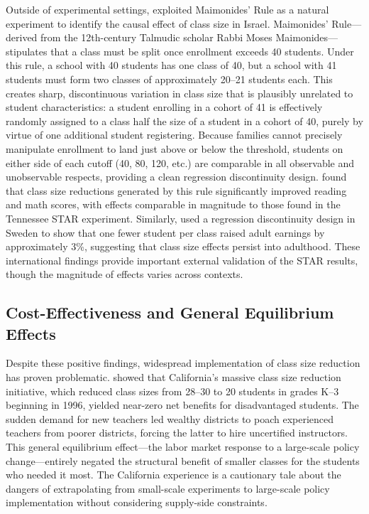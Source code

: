 \documentclass[12pt,letterpaper]{article}
\begin{document}
Outside of experimental settings, \citet{angrist1999} exploited Maimonides' Rule as a natural experiment to identify the causal effect of class size in Israel. Maimonides' Rule---derived from the 12th-century Talmudic scholar Rabbi Moses Maimonides---stipulates that a class must be split once enrollment exceeds 40 students. Under this rule, a school with 40 students has one class of 40, but a school with 41 students must form two classes of approximately 20--21 students each. This creates sharp, discontinuous variation in class size that is plausibly unrelated to student characteristics: a student enrolling in a cohort of 41 is effectively randomly assigned to a class half the size of a student in a cohort of 40, purely by virtue of one additional student registering. Because families cannot precisely manipulate enrollment to land just above or below the threshold, students on either side of each cutoff (40, 80, 120, etc.) are comparable in all observable and unobservable respects, providing a clean regression discontinuity design. \citet{angrist1999} found that class size reductions generated by this rule significantly improved reading and math scores, with effects comparable in magnitude to those found in the Tennessee STAR experiment. Similarly, \citet{fredriksson2013} used a regression discontinuity design in Sweden to show that one fewer student per class raised adult earnings by approximately 3\%, suggesting that class size effects persist into adulthood. These international findings provide important external validation of the STAR results, though the magnitude of effects varies across contexts.

\subsection{Cost-Effectiveness and General Equilibrium Effects}

Despite these positive findings, widespread implementation of class size reduction has proven problematic. \citet{jepsen2009} showed that California's massive class size reduction initiative, which reduced class sizes from 28--30 to 20 students in grades K--3 beginning in 1996, yielded near-zero net benefits for disadvantaged students. The sudden demand for new teachers led wealthy districts to poach experienced teachers from poorer districts, forcing the latter to hire uncertified instructors. This general equilibrium effect---the labor market response to a large-scale policy change---entirely negated the structural benefit of smaller classes for the students who needed it most. The California experience is a cautionary tale about the dangers of extrapolating from small-scale experiments to large-scale policy implementation without considering supply-side constraints.
\end{document}
